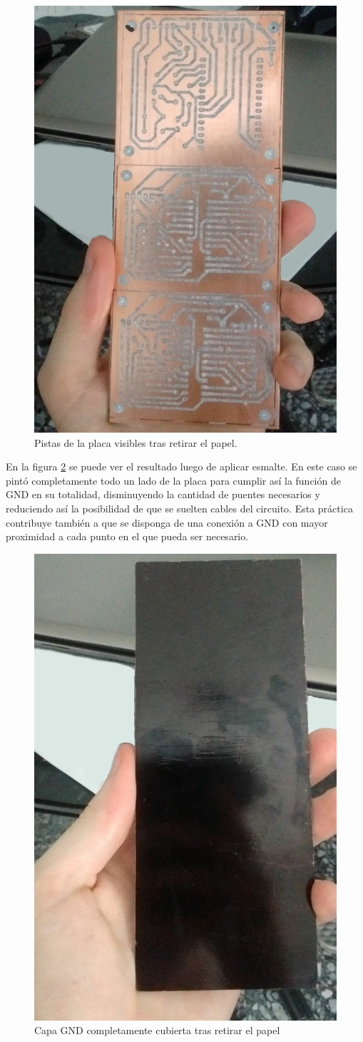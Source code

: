 \begin{figure}[ht!]
	\centering
	\includegraphics[width=0.47\linewidth]{imagenes/pcbeando/pos-sacado-pape-1.png}
	\caption{Pistas de la placa visibles tras retirar el papel.}
	\label{fig:pos-sacado-papel-1}
\end{figure}

En la figura \ref{fig:pos-sacado-papel-2} se puede ver el resultado luego de aplicar esmalte. En este caso se pintó completamente todo un lado de la placa para cumplir así la función de GND en su totalidad, disminuyendo la cantidad de puentes necesarios y reduciendo así la posibilidad de que se suelten cables del circuito. Esta práctica contribuye también a que se disponga de una conexión a GND con mayor proximidad a cada punto en el que pueda ser necesario. 

\begin{figure}[ht!]
	\centering
	\includegraphics[width=0.47\linewidth]{imagenes/pcbeando/pos-sacado-papel-2.png}
	\caption{Capa GND completamente cubierta tras retirar el papel}
	\label{fig:pos-sacado-papel-2}
\end{figure}



